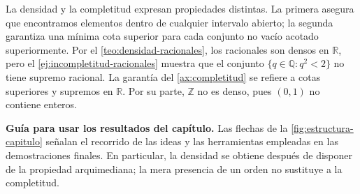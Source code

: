 \begin{remark}
\label{obs:densidad-completitud}
La densidad y la completitud expresan propiedades distintas. La primera asegura que encontramos elementos dentro de cualquier intervalo abierto; la segunda garantiza una mínima cota superior para cada conjunto no vacío acotado superiormente. Por el \cref{teo:densidad-racionales}, los racionales son densos en $\mathbb{R}$, pero el \cref{ej:incompletitud-racionales} muestra que el conjunto $\{q\in\mathbb{Q}:q^2<2\}$ no tiene supremo racional. La garantía del \cref{ax:completitud} se refiere a cotas superiores y supremos en $\mathbb{R}$. Por su parte, $\mathbb{Z}$ no es denso, pues $(0,1)$ no contiene enteros.
\end{remark}

\medskip
\noindent\textbf{Guía para usar los resultados del capítulo.}
Las flechas de la \cref{fig:estructura-capitulo} señalan el recorrido de las ideas y las herramientas empleadas en las demostraciones finales. En particular, la densidad se obtiene después de disponer de la propiedad arquimediana; la mera presencia de un orden no sustituye a la completitud.

\begin{center}
\begin{minipage}{\linewidth}
\centering
\captionsetup{hypcap=false}

\label{fig:estructura-capitulo}
\end{minipage}
\end{center}

